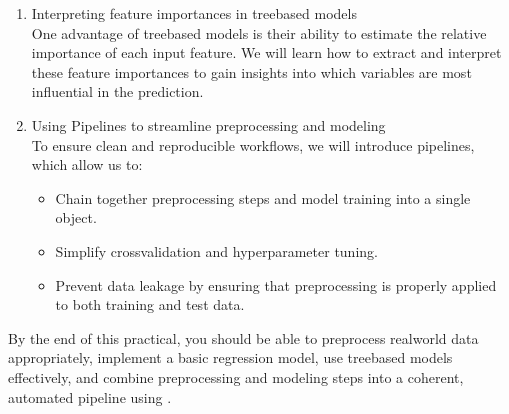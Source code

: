 \documentclass[letterpaper,10pt,english]{jupyterBook}
\begin{document}
\begin{enumerate}
\begin{itemize}
\item {} 
\sphinxAtStartPar
Random Forests: an ensemble method that combines multiple decision trees to improve predictive accuracy and reduce overfitting.

\end{itemize}

\item {} 
\sphinxAtStartPar
Interpreting feature importances in tree\sphinxhyphen{}based models\\
One advantage of tree\sphinxhyphen{}based models is their ability to estimate the relative importance of each input feature. We will learn how to extract and interpret these feature importances to gain insights into which variables are most influential in the prediction.

\item {} 
\sphinxAtStartPar
Using  Pipelines to streamline preprocessing and modeling\\
To ensure clean and reproducible workflows, we will introduce  pipelines, which allow us to:
\begin{itemize}
\item {} 
\sphinxAtStartPar
Chain together preprocessing steps and model training into a single object.

\item {} 
\sphinxAtStartPar
Simplify cross\sphinxhyphen{}validation and hyperparameter tuning.

\item {} 
\sphinxAtStartPar
Prevent data leakage by ensuring that preprocessing is properly applied to both training and test data.

\end{itemize}

\end{enumerate}

\sphinxAtStartPar
By the end of this practical, you should be able to preprocess real\sphinxhyphen{}world data appropriately, implement a basic regression model, use tree\sphinxhyphen{}based models effectively, and combine preprocessing and modeling steps into a coherent, automated pipeline using .
\end{document}
